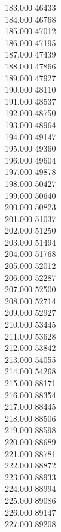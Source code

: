 { 183.000	46433 \\
 184.000	46768 \\
 185.000	47012 \\
 186.000	47195 \\
 187.000	47439 \\
 188.000	47866 \\
 189.000	47927 \\
 190.000	48110 \\
 191.000	48537 \\
 192.000	48750 \\
 193.000	48964 \\
 194.000	49147 \\
 195.000	49360 \\
 196.000	49604 \\
 197.000	49878 \\
 198.000	50427 \\
 199.000	50640 \\
 200.000	50823 \\
 201.000	51037 \\
 202.000	51250 \\
 203.000	51494 \\
 204.000	51768 \\
 205.000	52012 \\
 206.000	52287 \\
 207.000	52500 \\
 208.000	52714 \\
 209.000	52927 \\
 210.000	53445 \\
 211.000	53628 \\
 212.000	53842 \\
 213.000	54055 \\
 214.000	54268 \\
 215.000	88171 \\
 216.000	88354 \\
 217.000	88445 \\
 218.000	88506 \\
 219.000	88598 \\
 220.000	88689 \\
 221.000	88781 \\
 222.000	88872 \\
 223.000	88933 \\
 224.000	88994 \\
 225.000	89086 \\
 226.000	89147 \\
 227.000	89208 \\
}
